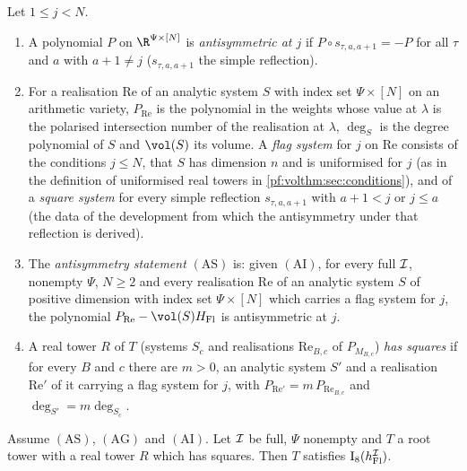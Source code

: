 \begin{definition}\label{pf:volthm:def:antisym}
Let $1\le j<N$.
\begin{enumerate}[label=(\alph*)]
\item A polynomial $P$ on $\R^{\Psi\times[N]}$ is \emph{antisymmetric at $j$} if $P\circ s_{\tau,a,a+1}=-P$ for all $\tau$ and
$a$ with $a+1\ne j$ ($s_{\tau,a,a+1}$ the simple reflection).
\item For a realisation $\mathrm{Re}$ of an analytic system $S$ with index set $\Psi\times[N]$ on an arithmetic variety,
$P_{\mathrm{Re}}$ is the polynomial in the weights whose value at $\lambda$ is the polarised intersection number of the
realisation at $\lambda$, $\deg_S$ is the degree polynomial of $S$ and $\vol(S)$ its volume. A \emph{flag system} for $j$
on $\mathrm{Re}$ consists of the conditions $j\le N$, that $S$ has dimension $n$ and is uniformised for $j$ (as in the
definition of uniformised real towers in \cref{pf:volthm:sec:conditions}), and of a \emph{square system} for every
simple reflection $s_{\tau,a,a+1}$ with $a+1<j$ or $j\le a$ (the data of the development from which the antisymmetry
under that reflection is derived).
\item The \emph{antisymmetry statement} $(\mathrm{AS})$ is: given $(\mathrm{AI})$, for every full $\mathcal{I}$, nonempty $\Psi$,
$N\ge2$ and every realisation $\mathrm{Re}$ of an analytic system $S$ of positive dimension with index set $\Psi\times[N]$
which carries a flag system for $j$, the polynomial $P_{\mathrm{Re}}-\vol(S)H_{\mathrm{Fl}}$ is antisymmetric at $j$.
\item A real tower $R$ of $T$ (systems $S_c$ and realisations $\mathrm{Re}_{B,c}$ of $P_{M_{B,c}}$) \emph{has squares} if
for every $B$ and $c$ there are $m>0$, an analytic system $S'$ and a realisation $\mathrm{Re}'$ of it carrying a flag
system for $j$, with $P_{\mathrm{Re}'}=m\,P_{\mathrm{Re}_{B,c}}$ and $\deg_{S'}=m\deg_{S_c}$.
\end{enumerate}
\end{definition}

\begin{lemma}\label{pf:volthm:lem:squares}
Assume $(\mathrm{AS})$, $(\mathrm{AG})$ and $(\mathrm{AI})$. Let $\mathcal{I}$ be full, $\Psi$ nonempty and $T$ a root tower with a
real tower $R$ which has squares. Then $T$ satisfies $\mathrm{I}_8(h_{\mathrm{Fl}}^{\mathcal{I}})$.
\end{lemma}

